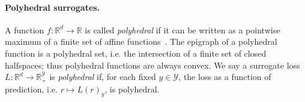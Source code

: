 \documentclass{article}
\newtheorem{theorem}{Theorem}
\theoremstyle{definition}\newtheorem{definition}{Definition}
\theoremstyle{definition}\newtheorem{assumption}{Assumption}
\newcommand{\Comments}{1}
\newcommand{\mynote}[2]{\ifnum\Comments=1\textcolor{#1}{#2}\fi}
\newcommand{\raf}[1]{\mynote{green}{[RF: #1]}}
\newcommand{\reals}{\mathbb{R}}
\newcommand{\D}{\mathcal{D}}
\newcommand{\Y}{\mathcal{Y}}
\begin{document}


%
%
%


\paragraph{Polyhedral surrogates.}
A function $f: \reals^d \to \reals$ is called \emph{polyhedral} if it can be written as a pointwise maximum of a finite set of affine functions~\citep[\S~19]{rockafellar1997convex}.
The epigraph of a polyhedral function is a polyhedral set, i.e. the intersection of a finite set of closed halfspaces; thus polyhedral functions are always convex.
We say a surrogate loss $L: \reals^d \to \reals_+^{\Y}$ is \emph{polyhedral} if, for each fixed $y \in \Y$, the loss as a function of prediction, i.e. $r \mapsto L(r)_y$, is polyhedral.
\end{document}
